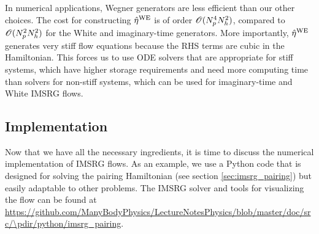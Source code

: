{In numerical applications, Wegner generators are less efficient than 
our other choices. The cost for constructing $\hat{\eta}^\text{WE}$ is of 
order $\mathcal{O}(N^4_pN^2_h)$, compared to $\mathcal{O}(N^2_pN^2_h)$ for the White
and imaginary-time generators. More importantly, $\hat{\eta}^\text{WE}$ 
generates very stiff flow equations because the RHS terms are cubic in 
the Hamiltonian. This forces us to use ODE solvers that are appropriate
for stiff systems, which have higher storage requirements and need more
computing time than solvers for non-stiff systems, which can be used
for imaginary-time and White IMSRG flows.




\subsection{\label{sec:imsrg_implementation}Implementation}
Now that we have all the necessary ingredients, it is time to discuss the
numerical implementation of IMSRG flows. As an example, we use a Python
code that is designed for solving the pairing Hamiltonian (see section 
\ref{sec:imsrg_pairing}) but easily adaptable to other problems. The
IMSRG solver and tools for visualizing the flow can be found at
\url{https://github.com/ManyBodyPhysics/LectureNotesPhysics/blob/master/doc/src/\pdir/python/imsrg_pairing}.

}
